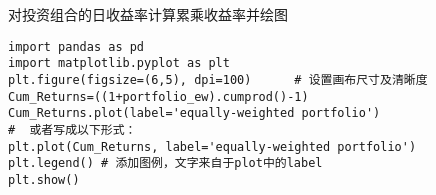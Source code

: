 \documentclass[t]{beamer}
\begin{document}
\begin{frame}[fragile]{对投资组合的日收益率计算累乘收益率并绘图}
\begin{lstlisting}
import pandas as pd
import matplotlib.pyplot as plt
plt.figure(figsize=(6,5), dpi=100)      # 设置画布尺寸及清晰度
Cum_Returns=((1+portfolio_ew).cumprod()-1) 
Cum_Returns.plot(label='equally-weighted portfolio')  
#  或者写成以下形式：
plt.plot(Cum_Returns, label='equally-weighted portfolio')
plt.legend() # 添加图例，文字来自于plot中的label
plt.show()
\end{lstlisting}
\end{frame}
\end{document}
